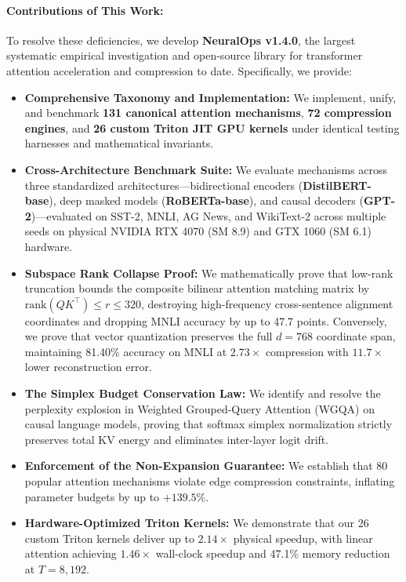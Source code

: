\documentclass{article}
\begin{document}
\paragraph{Contributions of This Work:}
To resolve these deficiencies, we develop \textbf{NeuralOps v1.4.0}, the largest systematic empirical investigation and open-source library for transformer attention acceleration and compression to date. Specifically, we provide:
\begin{itemize}
    \item \textbf{Comprehensive Taxonomy and Implementation:} We implement, unify, and benchmark \textbf{131 canonical attention mechanisms}, \textbf{72 compression engines}, and \textbf{26 custom Triton JIT GPU kernels} under identical testing harnesses and mathematical invariants.
    \item \textbf{Cross-Architecture Benchmark Suite:} We evaluate mechanisms across three standardized architectures---bidirectional encoders (\textbf{DistilBERT-base}), deep masked models (\textbf{RoBERTa-base}), and causal decoders (\textbf{GPT-2})---evaluated on SST-2, MNLI, AG News, and WikiText-2 across multiple seeds on physical NVIDIA RTX 4070 (SM 8.9) and GTX 1060 (SM 6.1) hardware.
    \item \textbf{Subspace Rank Collapse Proof:} We mathematically prove that low-rank truncation bounds the composite bilinear attention matching matrix by $\text{rank}(QK^\top) \le r \le 320$, destroying high-frequency cross-sentence alignment coordinates and dropping MNLI accuracy by up to 47.7 points. Conversely, we prove that vector quantization preserves the full $d=768$ coordinate span, maintaining 81.40\% accuracy on MNLI at $2.73\times$ compression with $11.7\times$ lower reconstruction error.
    \item \textbf{The Simplex Budget Conservation Law:} We identify and resolve the perplexity explosion in Weighted Grouped-Query Attention (WGQA) on causal language models, proving that softmax simplex normalization strictly preserves total KV energy and eliminates inter-layer logit drift.
    \item \textbf{Enforcement of the Non-Expansion Guarantee:} We establish that 80 popular attention mechanisms violate edge compression constraints, inflating parameter budgets by up to $+139.5\%$.
    \item \textbf{Hardware-Optimized Triton Kernels:} We demonstrate that our 26 custom Triton kernels deliver up to $2.14\times$ physical speedup, with linear attention achieving $1.46\times$ wall-clock speedup and 47.1\% memory reduction at $T=8,192$.
\end{itemize}
\end{document}
